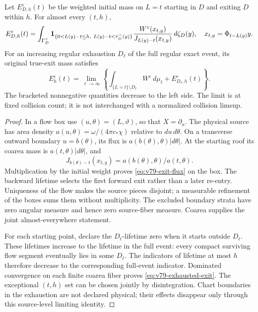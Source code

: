 \begin{proposition}
\label{prop:v79-source-exit-flux}
Let $E_{D,h}^\varepsilon(t)$ be the weighted initial mass on $L=t$
starting in $D$ and exiting $D$ within $h$. For almost every $(t,h)$,
\begin{equation}\label{eq:v79-exit-flux}
 E_{D,h}^\varepsilon(t)=
 \int_{\Gamma_D^+}
 \one_{\{0<L(y)-t\le h,\ L(y)-t<\tau_D^-(y)\}}
 \frac{W^\varepsilon(x_{t,y})}
      {J_{L(y)-t}(x_{t,y})}\,d\zeta_D(y),
 \quad x_{t,y}=\Phi_{t-L(y)}y.
\end{equation}
For an increasing regular exhaustion $D_\ell$ of the full regular
exact event, its original true-exit mass satisfies
\begin{equation}\label{eq:v79-exhausted-exit}
 E_h^\varepsilon(t)=\lim_{\ell\to\infty}
 \left\{\int_{\{L=t\}\setminus D_\ell}W^\varepsilon\,d\mu_t
                                  +E_{D_\ell,h}^\varepsilon(t)\right\}.
\end{equation}
The bracketed nonnegative quantities decrease to the left side.
The limit is at fixed collision count; it is not interchanged with
a normalized collision limsup.
\end{proposition}
\begin{proof}
In a flow box use $(u,\theta)=(L,\vartheta)$, so that $X=\partial_u$.
The physical source has area density
$a(u,\theta)=\omega/(4\pi c_*\chi)$ relative to $du\,d\theta$.
On a transverse outward boundary $u=b(\theta)$, its flux is
$a(b(\theta),\theta)|d\theta|$. At the starting roof its coarea
mass is $a(t,\theta)|d\theta|$, and
\[
 J_{b(\theta)-t}(x_{t,y})
                        =a(b(\theta),\theta)/a(t,\theta).
\]
Multiplication by the initial weight proves \eqref{eq:v79-exit-flux}
on the box. The backward lifetime selects the first forward exit
rather than a later re-entry. Uniqueness of the flow makes the source
pieces disjoint; a measurable refinement of the boxes sums them
without multiplicity. The excluded boundary strata have zero angular
measure and hence zero source-fiber measure. Coarea supplies the joint
almost-everywhere statement.

For each starting point, declare the $D_\ell$-lifetime zero when it
starts outside $D_\ell$. These lifetimes increase to the lifetime in
the full event: every compact surviving flow segment eventually lies
in some $D_\ell$. The indicators of lifetime at most $h$ therefore
decrease to the corresponding full-event indicator. Dominated
convergence on each finite coarea fiber proves
\eqref{eq:v79-exhausted-exit}. The exceptional $(t,h)$ set can be
chosen jointly by disintegration. Chart boundaries in the exhaustion
are not declared physical; their effects disappear only through this
source-level limiting identity.
\end{proof}


